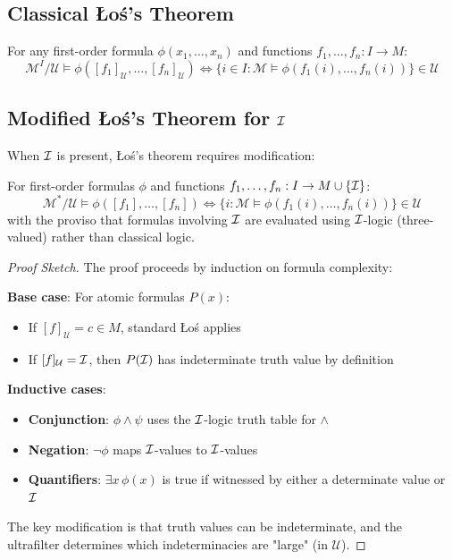 \subsection{Classical Łoś's Theorem}

\begin{theorem}
\label{thm:los-classical}
For any first-order formula $\phi(x_1, \ldots, x_n)$ and functions $f_1, \ldots, f_n : I \to M$:
\[
\mathcal{M}^I/\mathcal{U} \models \phi([f_1]_{\mathcal{U}}, \ldots, [f_n]_{\mathcal{U}}) \iff \{i \in I : \mathcal{M} \models \phi(f_1(i), \ldots, f_n(i))\} \in \mathcal{U}
\]
\end{theorem}

\subsection{Modified Łoś's Theorem for $\mathcal{I}$}

When $\mathcal{I}$ is present, Łoś's theorem requires modification:

\begin{theorem}
\label{thm:los-extended}
For first-order formulas $\phi$ and functions $f_1, \ldots, f_n : I \to M \cup \{\mathcal{I}\}$:
\[
\mathcal{M}^*/\mathcal{U} \models \phi([f_1], \ldots, [f_n]) \iff \{i : \mathcal{M} \models \phi(f_1(i), \ldots, f_n(i))\} \in \mathcal{U}
\]
with the proviso that formulas involving $\mathcal{I}$ are evaluated using $\mathcal{I}$-logic (three-valued) rather than classical logic.
\end{theorem}

\begin{proof}[Proof Sketch]
The proof proceeds by induction on formula complexity:

\textbf{Base case}: For atomic formulas $P(x)$:
\begin{itemize}
    \item If $[f]_{\mathcal{U}} = c \in M$, standard Łoś applies
    \item If $[f]_{\mathcal{U}} = \mathcal{I}$, then $P(\mathcal{I})$ has indeterminate truth value by definition
\end{itemize}

\textbf{Inductive cases}:
\begin{itemize}
    \item \textbf{Conjunction}: $\phi \land \psi$ uses the $\mathcal{I}$-logic truth table for $\land$
    \item \textbf{Negation}: $\neg \phi$ maps $\mathcal{I}$-values to $\mathcal{I}$-values
    \item \textbf{Quantifiers}: $\exists x \, \phi(x)$ is true if witnessed by either a determinate value or $\mathcal{I}$
\end{itemize}

The key modification is that truth values can be indeterminate, and the ultrafilter determines which indeterminacies are "large" (in $\mathcal{U}$).
\end{proof}

